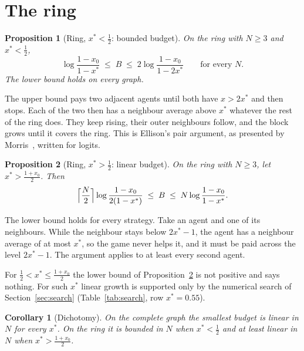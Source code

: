 \documentclass[11pt,a4paper]{article}
\theoremstyle{definition}
\theoremstyle{plain}
\newtheorem{proposition}{Proposition}
\newtheorem{corollary}{Corollary}
\newcommand{\Binf}{B}
\newcommand{\xs}{x^{*}}
\begin{document}
\section{The ring}\label{sec:ring}

\begin{proposition}[Ring, $\xs<\tfrac12$: bounded budget]\label{prop:ring-low}
On the ring with $N\ge3$ and $\xs<\tfrac12$,
\[
\log\frac{1-x_0}{1-\xs}\;\le\;\Binf\;\le\;2\log\frac{1-x_0}{1-2\xs}\qquad\text{for every }N .
\]
The lower bound holds on every graph.
\end{proposition}

The upper bound pays two adjacent agents until both have $x>2\xs$ and then stops. Each of the two then has a neighbour average above $\xs$ whatever the rest of the ring does. They keep rising, their outer neighbours follow, and the block grows until it covers the ring. This is Ellison's pair argument, as presented by Morris~\cite{morris2000}, written for logits.

\begin{proposition}[Ring, $\xs>\tfrac12$: linear budget]\label{prop:ring-high}
On the ring with $N\ge3$, let $\xs>\tfrac{1+x_0}{2}$. Then
\[
\Bigl\lceil\frac N2\Bigr\rceil\log\frac{1-x_0}{2(1-\xs)}\;\le\;\Binf\;\le\;N\log\frac{1-x_0}{1-\xs}.
\]
\end{proposition}

The lower bound holds for every strategy. Take an agent and one of its neighbours. While the neighbour stays below $2\xs-1$, the agent has a neighbour average of at most $\xs$, so the game never helps it, and it must be paid across the level $2\xs-1$. The argument applies to at least every second agent.

For $\tfrac12<\xs\le\tfrac{1+x_0}{2}$ the lower bound of Proposition~\ref{prop:ring-high} is not positive and says nothing. For such $\xs$ linear growth is supported only by the numerical search of Section~\ref{sec:search} (Table~\ref{tab:search}, row $\xs=0.55$).

\begin{corollary}[Dichotomy]\label{cor:dichotomy}
On the complete graph the smallest budget is linear in $N$ for every $\xs$. On the ring it is bounded in $N$ when $\xs<\tfrac12$ and at least linear in $N$ when $\xs>\tfrac{1+x_0}{2}$.
\end{corollary}
\end{document}
